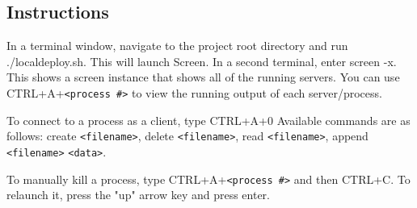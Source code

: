 \documentclass{article}
\begin{document}
%
%
%
\subsection*{Instructions}
    In a terminal window, navigate to the project root directory and run ./localdeploy.sh. This will launch  Screen. In a second terminal, enter screen -x. This shows a screen instance that shows all of the running servers. You can use CTRL+A+\verb|<process #>| to view the running output of each server/process. 

    To connect to a process as a client, type CTRL+A+0 Available commands are as follows: create \verb|<filename>|, delete \verb|<filename>|, read \verb|<filename>|, append \verb|<filename>| \verb|<data>|.

    To manually kill a process, type CTRL+A+\verb|<process #>| and then CTRL+C. To relaunch it, press the "up" arrow key and press enter.
\end{document}

